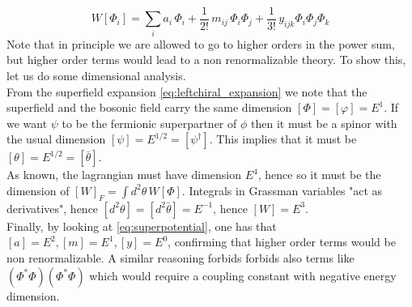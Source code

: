 \documentclass[12pt]{article}
\begin{document}
\begin{equation*}
  W[\Phi_i] = \sum_i a_i \, \Phi_i + \frac{1}{2!} \, m_{ij} \, \Phi_i\Phi_j + \frac{1}{3!} \, y_{ijk} \Phi_i \Phi_j \Phi_k
\end{equation*}
Note that in principle we are allowed to go to higher orders in the power sum, but higher order terms would lead to a non renormalizable theory. To show this, let us do some dimensional analysis. \\
From the superfield expansion \ref{eq:leftchiral_expansion} we note that the superfield and the bosonic field carry the same dimension $[\Phi] = [\varphi] = E^1$. If we want $\psi$ to be the fermionic 
superpartner of $\phi$ then it must be a spinor with the usual dimension $[\psi] = E^{1/2} = [\psi^\dagger]$. This implies that it must be $[\theta] = E^{1/2} = [\bar\theta]$. \\ 
As known, the lagrangian must have dimension $E^4$, hence so  
it must be the dimension of $[W]_F = \int d^2\theta \, W[\Phi]$. Integrals in Grassman variables "act as derivatives", hence $[d^2\theta] = [d^2\bar\theta] = E^{-1}$, hence $[W] = E^3$. \\
Finally, by looking at \ref{eq:superpotential}, one has that $[a] = E^2, [m] = E^1, [y] = E^0$, confirming that higher order terms would be non renormalizable. A similar reasoning forbids forbids also terms like $(\Phi^*\Phi)(\Phi^*\Phi)$ which would require a coupling constant with negative energy dimension. \\

\vspace{15pt}
\end{document}
